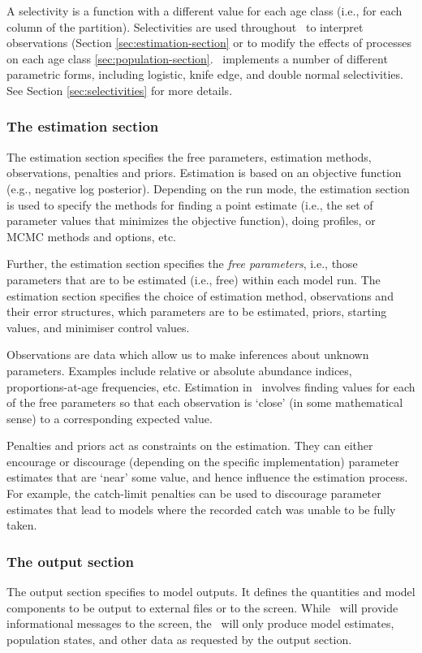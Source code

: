 A selectivity is a function with a different value for each age class (i.e., for each column of the partition). Selectivities are used throughout \SPM\ to interpret observations (Section \ref{sec:estimation-section} or to modify the effects of processes on each age class \ref{sec:population-section}. \SPM\ implements a number of different parametric forms, including logistic, knife edge, and double normal selectivities. See Section \ref{sec:selectivities} for more details.

\subsubsection{The estimation section}

The estimation section specifies the free parameters, estimation methods, observations, penalties and priors. Estimation is based on an objective function (e.g., negative log posterior). Depending on the run mode, the estimation section is used to specify the methods for finding a point estimate (i.e., the set of parameter values that minimizes the objective function), doing profiles, or MCMC methods and options, etc.

Further, the estimation section specifies the \emph{free parameters}, i.e., those parameters that are to be estimated (i.e., free) within each model run. The estimation section specifies the choice of estimation method, observations and their error structures, which parameters are to be estimated, priors, starting values, and minimiser control values.

Observations are data which allow us to make inferences about unknown parameters. Examples include relative or absolute abundance indices, proportions-at-age frequencies, etc. Estimation in \SPM\ involves finding values for each of the free parameters so that each observation is `close' (in some mathematical sense) to a corresponding expected value. 

Penalties and priors act as constraints on the estimation. They can either encourage or discourage (depending on the specific implementation) parameter estimates that are `near' some value, and hence influence the estimation process. For example, the catch-limit penalties can be used to discourage parameter estimates that lead to models where the recorded catch was unable to be fully taken.

\subsubsection{The output section}

The output section specifies to model outputs. It defines the quantities and model components to be output to external files or to the screen. While \SPM\ will provide informational messages to the screen, the \SPM\ will only produce model estimates, population states, and other data as requested by the output section. 
